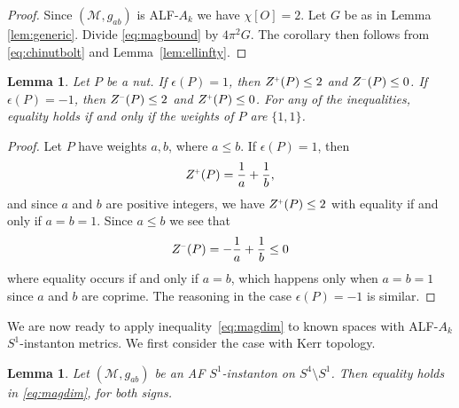 \documentclass[a4paper,11pt,reqno]{amsart}
\newcommand{\nut}{P}
\newcommand{\cM}{\mathcal{M}}
\theoremstyle{plain}
\newtheorem{lemma}[thm]{Lemma}
\renewcommand{\P}[1]{{{#1}^{\hspace{-.5pt}\scaleto{+}{4pt}}}}
\newcommand{\M}[1]{{{#1}^{\hspace{-.5pt}\scaleto{-}{4pt}}}}
\numberwithin{equation}{section}
\begin{document}
\begin{proof} 
Since $(\cM, g_{ab})$ is ALF-$A_k$ we have $\chi[O] = 2$. Let $G$ be as in Lemma \ref{lem:generic}. Divide \eqref{eq:magbound} by $4\pi^2 G$. The corollary then follows from \eqref{eq:chinutbolt} and Lemma~\ref{lem:ellinfty}.
\end{proof} 

\begin{lemma}\label{lem:Zpm-est} 
Let $\nut$ be a nut. If $\epsilon(\nut)=1$, then $\P{Z}(\nut)\leq2$ and $\M{Z}(\nut)\leq 0$. If $\epsilon(\nut)=-1$, then $\M{Z}(\nut)\leq 2$ and $\P{Z}(\nut)\leq 0$. For any of the inequalities, equality holds if and only if the weights of $\nut$ are $\{1,1\}$.
\end{lemma}

\begin{proof}
Let $\nut$ have weights $a,b$, where $a\leq b$. If $\epsilon(\nut)=1$, then 
\begin{align}
\P{Z}(\nut)=\frac{1}{a}+\frac{1}{b},
\end{align} 
and since $a$ and $b$ are positive integers, we have $\P{Z}(\nut)\leq 2$ with equality if and only if $a=b=1$. Since $a\leq b$ we see that 
\begin{align}
\M{Z}(\nut)=-\frac{1}{a}+\frac{1}{b}\leq 0
\end{align} 
where equality occurs if and only if $a=b$, which happens only when  $a=b=1$ since $a$ and $b$ are coprime. The reasoning in the case $\epsilon(\nut)=-1$ is similar.
\end{proof}

We are now ready to apply inequality~\eqref{eq:magdim} to known spaces with ALF-$A_k$ $S^1$-instanton metrics. We first consider the case with Kerr topology. 

\begin{lemma} \label{lem:Kerr-eq}
Let $(\cM,g_{ab})$ be an AF $S^1$-instanton on $S^4 \setminus S^1$. Then equality holds in \eqref{eq:magdim}, for both signs. 
\end{lemma}
\end{document}
